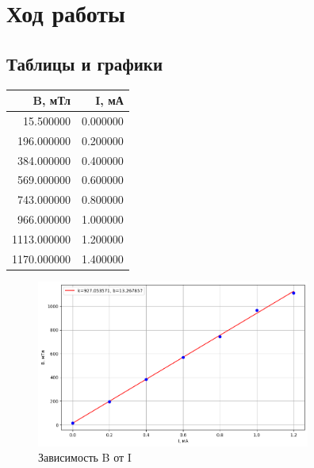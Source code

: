 \documentclass[a4paper, 12pt]{article}
\begin{document}
\section{Ход работы}

\subsection{Таблицы и графики}
\newpage
\begin{table}[h!]
    \centering
\begin{tabular}{rr}
    \toprule
    B, мТл & I, мА \\
    \midrule
    15.500000 & 0.000000 \\
    196.000000 & 0.200000 \\
    384.000000 & 0.400000 \\
    569.000000 & 0.600000 \\
    743.000000 & 0.800000 \\
    966.000000 & 1.000000 \\
    1113.000000 & 1.200000 \\
    1170.000000 & 1.400000 \\
    \bottomrule
    \end{tabular}
\end{table}

    \begin{figure}[h!]
        \centering
        \includegraphics[width=90mm]{./images/ItoB.png}
        \caption{Зависимость B от I}
    \end{figure}
\end{document}
